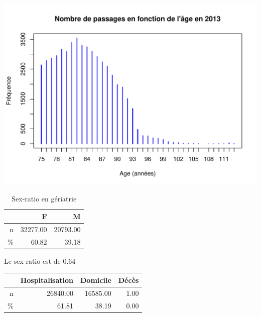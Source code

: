 \documentclass[12pt,english,french,twoside]{book}\usepackage[]{graphicx}\usepackage[]{color}
\makeatletter
\def\maxwidth{ %
  \ifdim\Gin@nat@width>\linewidth
    \linewidth
  \else
    \Gin@nat@width
  \fi
}
\newenvironment{knitrout}{}{} %
\makeatother
\begin{document}

\begin{knitrout}
\color{fgcolor}
\includegraphics[width=\maxwidth]{figure/passages_geriatrie} 

\end{knitrout}



\begin{table}[ht]
\centering
\begin{tabular}{rrr}
  \hline
 & F & M \\ 
  \hline
n & 32277.00 & 20793.00 \\ 
  \% & 60.82 & 39.18 \\ 
   \hline
\end{tabular}
\caption[Sex-ratio en gériatrie]{Sex-ratio en gériatrie} 
\label{tab:ger_sr}
\end{table}




Le sex-ratio est de $0.64$


\begin{table}[ht]
\centering
\begin{tabular}{rrrr}
  \hline
 & Hospitalisation & Domicile & Décès \\ 
  \hline
n & 26840.00 & 16585.00 & 1.00 \\ 
  \% & 61.81 & 38.19 & 0.00 \\ 
   \hline
\end{tabular}
\end{table}
\end{document}
